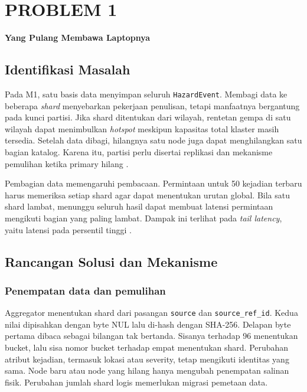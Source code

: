 \chapter{PROBLEM 1}
\label{ch:p1}

\begin{center}\large\bfseries Yang Pulang Membawa Laptopnya\end{center}

\section{Identifikasi Masalah}

Pada M1, satu basis data menyimpan seluruh \texttt{HazardEvent}. Membagi data ke beberapa \emph{shard} menyebarkan pekerjaan penulisan, tetapi manfaatnya bergantung pada kunci partisi. Jika shard ditentukan dari wilayah, rentetan gempa di satu wilayah dapat menimbulkan \emph{hotspot} meskipun kapasitas total klaster masih tersedia. Setelah data dibagi, hilangnya satu node juga dapat menghilangkan satu bagian katalog. Karena itu, partisi perlu disertai replikasi dan mekanisme pemulihan ketika primary hilang \cite{kleppmann2017}.

Pembagian data memengaruhi pembacaan. Permintaan untuk 50 kejadian terbaru harus memeriksa setiap shard agar dapat menentukan urutan global. Bila satu shard lambat, menunggu seluruh hasil dapat membuat latensi permintaan mengikuti bagian yang paling lambat. Dampak ini terlihat pada \emph{tail latency}, yaitu latensi pada persentil tinggi \cite{dean2013}.

\section{Rancangan Solusi dan Mekanisme}

\subsection{Penempatan data dan pemulihan}

Aggregator menentukan shard dari pasangan \texttt{source} dan \texttt{source\_ref\_id}. Kedua nilai dipisahkan dengan byte NUL lalu di-hash dengan SHA-256. Delapan byte pertama dibaca sebagai bilangan tak bertanda. Sisanya terhadap 96 menentukan bucket, lalu sisa nomor bucket terhadap empat menentukan shard. Perubahan atribut kejadian, termasuk lokasi atau severity, tetap mengikuti identitas yang sama. Node baru atau node yang hilang hanya mengubah penempatan salinan fisik. Perubahan jumlah shard logis memerlukan migrasi pemetaan data.

